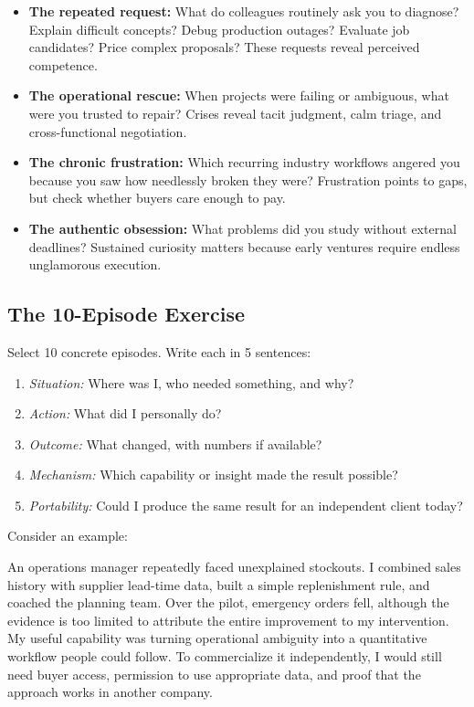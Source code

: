 \begin{itemize}[leftmargin=11pt,itemsep=2pt,topsep=1.5pt,parsep=0pt]
  \item \textbf{The repeated request:} What do colleagues routinely ask you to diagnose? Explain difficult concepts? Debug production outages? Evaluate job candidates? Price complex proposals? These requests reveal perceived competence.
  \item \textbf{The operational rescue:} When projects were failing or ambiguous, what were you trusted to repair? Crises reveal tacit judgment, calm triage, and cross-functional negotiation.
  \item \textbf{The chronic frustration:} Which recurring industry workflows angered you because you saw how needlessly broken they were? Frustration points to gaps, but check whether buyers care enough to pay.
  \item \textbf{The authentic obsession:} What problems did you study without external deadlines? Sustained curiosity matters because early ventures require endless unglamorous execution.
\end{itemize}

\subsection{The 10-Episode Exercise}

Select 10 concrete episodes. Write each in 5 sentences:

\begin{enumerate}[label=\textbf{\arabic*.},leftmargin=11pt,itemsep=1.5pt,topsep=1.5pt,parsep=0pt]
  \item \textit{Situation:} Where was I, who needed something, and why?
  \item \textit{Action:} What did I personally do?
  \item \textit{Outcome:} What changed, with numbers if available?
  \item \textit{Mechanism:} Which capability or insight made the result possible?
  \item \textit{Portability:} Could I produce the same result for an independent client today?
\end{enumerate}

Consider an example:

\begin{tcolorbox}[
  enhanced,
  colback=BayesPale!25!white,
  colframe=BayesBorder!60!white,
  boxrule=0.4pt,
  arc=2pt,
  left=6pt,right=6pt,top=4pt,bottom=4pt,
  before skip=3pt,after skip=4pt
]
\footnotesize\color{BayesInk}
An operations manager repeatedly faced unexplained stockouts. I combined sales history with supplier lead-time data, built a simple replenishment rule, and coached the planning team. Over the pilot, emergency orders fell, although the evidence is too limited to attribute the entire improvement to my intervention. My useful capability was turning operational ambiguity into a quantitative workflow people could follow. To commercialize it independently, I would still need buyer access, permission to use appropriate data, and proof that the approach works in another company.
\end{tcolorbox}

